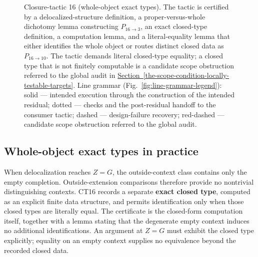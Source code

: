 \documentclass[
  11pt,
]{article}
\theoremstyle{definition}
\newcommand{\secref}[1]{\hyperref[#1]{Section~\ref*{#1}}}
\begin{document}
\begin{figure}[p]
{%
}
\caption[Closure-tactic 16: whole-object exact types]{Closure-tactic 16 (whole-object exact types).  The tactic is certified by a delocalized-structure definition, a proper-versus-whole dichotomy lemma constructing \(P_{16\to3}\), an exact closed-type definition, a computation lemma, and a literal-equality lemma that either identifies the whole object or routes distinct closed data as \(P_{16\to10}\).  The tactic demands literal closed-type equality; a closed type that is not finitely computable is a candidate scope obstruction referred to the global audit in \secref{the-scope-condition-locally-testable-targets}.  Line grammar (Fig.~\ref{fig:line-grammar-legend}): solid --- intended execution through the construction of the intended residual; dotted --- checks and the post-residual handoff to the consumer tactic; dashed --- design-failure recovery; red-dashed --- candidate scope obstruction referred to the global audit.}
\label{fig:ct16-whole-object-types}
\end{figure}
\FloatBarrier

\subsection*{Whole-object exact types in practice}

When delocalization reaches \(Z=G\), the outside-context class contains
only the empty completion. Outside-extension comparisons therefore
provide no nontrivial distinguishing contexts. CT16 records a separate
\textbf{exact closed type}, computed as an explicit finite data structure,
and permits identification only when those closed types are literally
equal. The certificate is
the closed-form computation itself, together with a lemma stating that
the degenerate empty context induces no additional identifications. An
argument at \(Z=G\) must exhibit the closed type explicitly; equality on
an empty context supplies no equivalence beyond the recorded closed
data.
\end{document}
